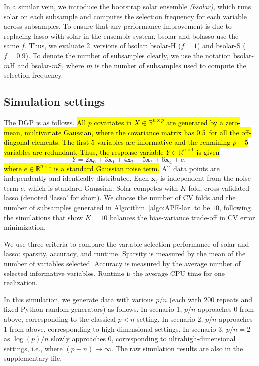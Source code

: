 \documentclass[11pt,review,authoryear]{elsarticle}
\begin{document}
In a similar vein, we introduce the bootstrap solar ensemble \emph{(bsolar)}, which runs solar on each subsample and computes the selection frequency for each variable across subsamples. To ensure that any performance improvement is due to replacing lasso with solar in the ensemble system, bsolar and bolasso use the same $f$. Thus, we evaluate 2~versions of bsolar: bsolar-H ($f=1$) and bsolar-S ($f=0.9$). To denote the number of subsamples clearly, we use the notation bsolar-$m$H and bsolar-$m$S, where $m$ is the number of subsamples used to compute the selection frequency.

\subsection{Simulation settings}

The DGP is as follows. \hl{All $p$ covariates in $X \in \mathbb{R}^{n \times p}$ are generated by a zero-mean, multivariate Gaussian, where the covariance matrix has 0.5~for all the off-diagonal elements. The first 5 variables are informative and the remaining $p-5$ variables are redundant. Thus, the response variable $Y \in \mathbb{R}^{n \times 1}$ is given}
%
\begin{equation}
%
  Y =  2 \mathbf{x}_0 + 3 \mathbf{x}_1 + 4 \mathbf{x}_2 + 5 \mathbf{x}_3 + 6 \mathbf{x}_4  + e,
  \label{eqn:pop_model}
\end{equation}
%
\hl{where $e\in \mathbb{R}^{n \times 1}$ is a standard Gaussian noise term.} All data points are independently and identically distributed. Each $\mathbf{x}_j$ is independent from the noise term $e$, which is standard Gaussian. Solar competes with $K$-fold, cross-validated lasso (denoted `lasso' for short). We choose the number of CV folds and the number of subsamples generated in Algorithm~\ref{algo:APE-lar} to be $10$, following the \citet{friedman2001elements} simulations that show $K = 10$ balances the bias-variance trade-off in CV error minimization.

We use three criteria to compare the variable-selection performance of solar and lasso: sparsity, accuracy, and runtime. Sparsity is measured by the mean of the number of variables selected. Accuracy is measured by the average number of selected informative variables. Runtime is the average CPU time for one realization.

In this simulation, we generate data with various $p/n$ (each with 200 repeats and fixed Python random generators) as follows. In scenario 1, $p/n$ approaches $0$ from above, corresponding to the classical $p<n$ setting. In scenario 2, $p/n$ approaches $1$ from above, corresponding to high-dimensional settings. In scenario 3, $p/n=2$ as $\log(p)/n$ slowly approaches $0$, corresponding to ultrahigh-dimensional settings, i.e., where $(p-n)\rightarrow\infty$. The raw simulation results are also in the supplementary file.
\end{document}
